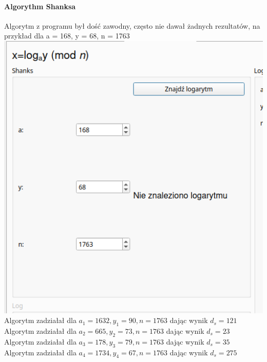 \documentclass{article}[12pt]
\begin{document}
\paragraph{Algorythm Shanksa }
Algorytm z programu był dość zawodny, często nie dawał żadnych rezultatów, na przykład dla a = 168, y = 68, n = 1763 \\ 
\includegraphics[width=1\textwidth]{eleven.png} \\ 
Algorytm zadziałał dla $a_1 = 1632, y_1 = 90, n = 1763$ dając wynik $d_s = 121$ \\ 
Algorytm zadziałał dla $a_2 = 665, y_2 = 73, n = 1763$ dając wynik $d_s = 23$ \\ 
Algorytm zadziałał dla $a_3 = 178, y_3 = 79, n = 1763$ dając wynik $d_s = 35$ \\ 
Algorytm zadziałał dla $a_4 = 1734, y_4 = 67, n = 1763$ dając wynik $d_s = 275$ \\ 
\end{document}
